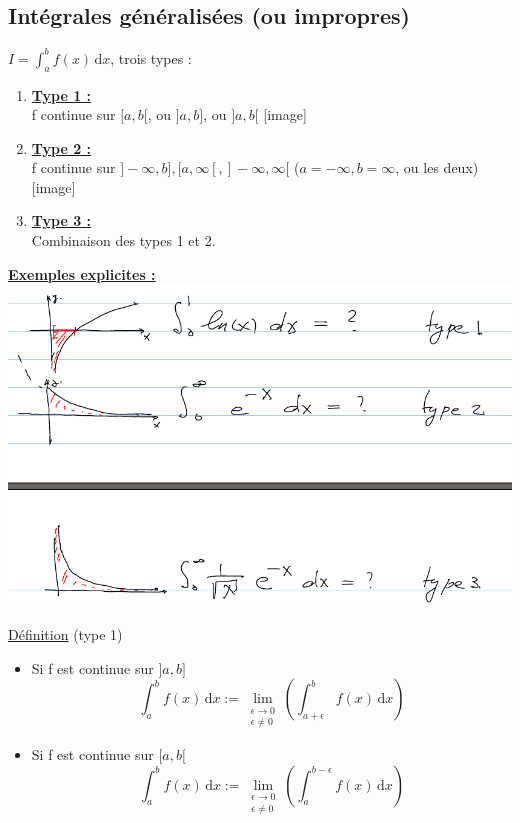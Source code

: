 \documentclass[12pt,a4paper]{article}
\newcommand{\limite}{\lim\limits_}
\newcommand{\llimite}[3]{\limite{\substack{#1 \\ #2}}\left(#3\right)}
\newcommand{\evid}[1]{\textbf{\underline{#1}}}
\newcommand{\Definition}{\underline{Définition} }
\newcommand{\intx}[3]{\ensuremath{\int_{#1}^{#2} #3 \, \mathrm dx}}
\begin{document}
{\subsection{Intégrales généralisées (ou impropres)}
$I = \intx{a}{b}{f(x)}$, trois types :
\begin{enumerate}
	\item \evid{Type 1 :}\\
		f continue sur $[a,b[$, ou $]a,b]$, ou $]a,b[$
		[image]
	\item \evid{Type 2 :}\\
	f continue sur $]-\infty,b], [a, \infty[, ]-\infty,\infty[$ ($a = -\infty, b = \infty$, ou les deux)
	[image]
	\item \evid{Type 3 :}\\
	Combinaison des types 1 et 2.
\end{enumerate}
\evid{Exemples explicites :}\\
\includegraphics[scale=0.5]{Illustrations_Analyse/ex_explicites2}\\
\begin{boite}
	\Definition (type 1)\\
	\begin{itemize}
		\item Si f est continue sur $]a,b]$
		\begin{equation}
			\intx{a}{b}{f(x)} := \llimite{\epsilon \to 0}{\epsilon  \neq 0}{\intx{a+\epsilon}{b}{f(x)}}
		\end{equation}
		\item Si f est continue sur $[a,b[$
		\begin{equation}
			\intx{a}{b}{f(x)} := \llimite{\epsilon \to 0}{\epsilon  \neq 0}{\intx{a}{b-\epsilon}{f(x)}}
		\end{equation}

\end{itemize}
\end{boite}}
\end{document}

